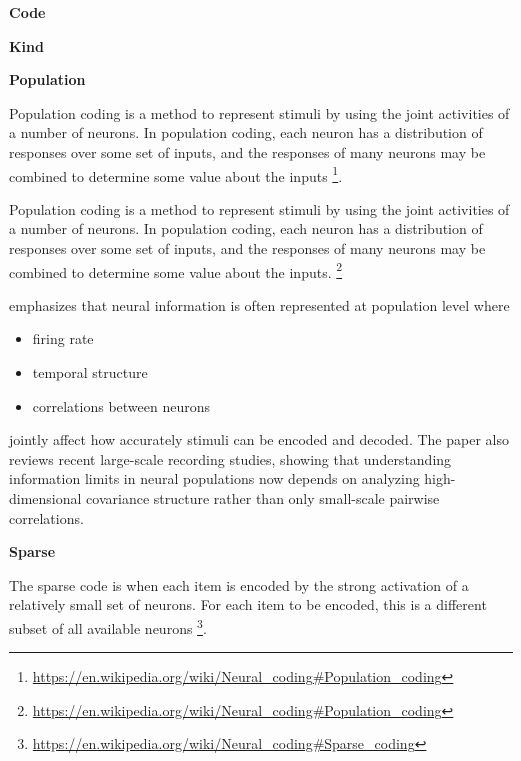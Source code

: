 \documentclass{book}
\providecommand{\ProjectDeepHeading}[2]{%
    \par\medskip\noindent\textbf{#2}\par\smallskip
}
\providecommand{\seeherefooter}[1]{\footnote{\url{#1}}}
\begin{document}
\ProjectDeepHeading{9}{Code}

\ProjectDeepHeading{10}{Kind}

\ProjectDeepHeading{11}{Population}


Population coding is a method to represent stimuli by using the joint activities of a number of neurons. In population coding, each neuron has a distribution of responses over some set of inputs, and the responses of many neurons may be combined to determine some value about the inputs \seeherefooter{https://en.wikipedia.org/wiki/Neural\_coding\#Population\_coding}.
    
    Population coding is a method to represent stimuli by using the joint activities of a number of neurons. In population coding, each neuron has a distribution of responses over some set of inputs, and the responses of many neurons may be combined to determine some value about the inputs.
    \seeherefooter{https://en.wikipedia.org/wiki/Neural\_coding\#Population\_coding}
    
    \cite{shimazaki-2025-neural-coding-foundational-concepts-statistical-formulations-and-recent-advances} emphasizes that neural information is often represented at population level where
    
    \begin{itemize}
        \item firing rate
        \item temporal structure
        \item correlations between neurons
    \end{itemize}
    jointly affect how accurately stimuli can be encoded and decoded. The paper also reviews recent large-scale recording studies, showing that understanding information limits in neural populations now depends on analyzing high-dimensional covariance structure rather than only small-scale pairwise correlations.
    \cite{shimazaki-2025-neural-coding-foundational-concepts-statistical-formulations-and-recent-advances}

\ProjectDeepHeading{11}{Sparse}


The sparse code is when each item is encoded by the strong activation of a relatively small set of neurons. For each item to be encoded, this is a different subset of all available neurons \seeherefooter{https://en.wikipedia.org/wiki/Neural_coding\#Sparse_coding}.
\end{document}

